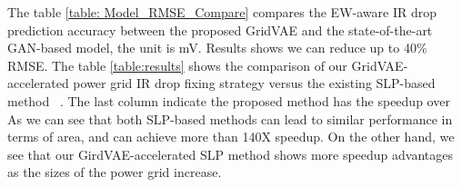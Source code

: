 \begin{table}[h]
	\begin{center} %
		\caption{ Comparison of the proposed VAE-accelerated SLP optimization method against the existing method}
		\label{table:results}
		\center
	\end{center}
	\vspace{-0.1in}
\end{table}
      The table \ref{table: Model_RMSE_Compare}  compares the EW-aware IR drop prediction accuracy between the proposed GridVAE and the state-of-the-art GAN-based model, the unit is mV. Results shows we can reduce up to 40\% RMSE. 
      The table \ref{table:results} shows the comparison of our GridVAE-accelerated power grid IR drop fixing strategy versus the existing SLP-based method~\cite{Sukharev:2019pg} . The last column indicate
      the proposed method has the speedup over~\cite{Sukharev:2019pg}
      As we can see that both SLP-based
      methods can lead to similar performance in terms of area,  and can achieve more than 140X speedup.  On the other hand, we see that our GirdVAE-accelerated SLP method shows more speedup advantages as the sizes of the power grid increase.
      








